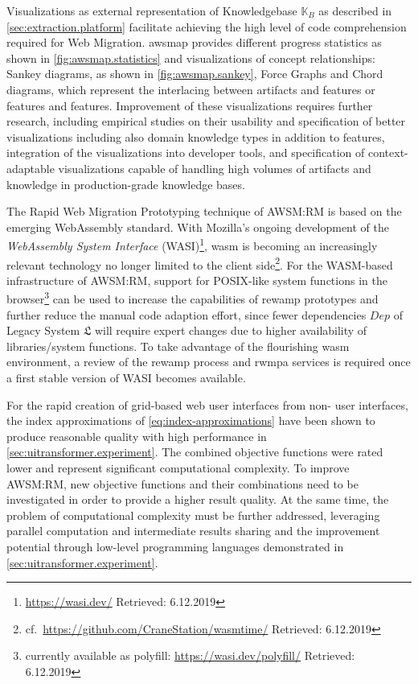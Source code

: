 Visualizations as external representation of Knowledgebase \(\mathbb{K}_{B}\) as described in \cref{sec:extraction.platform} facilitate achieving the high level of code comprehension required for \gls{Web Migration}.
\gls{awsmap} provides different progress statistics as shown in \cref{fig:awsmap.statistics} and visualizations of concept relationships: Sankey diagrams, as shown in \cref{fig:awsmap.sankey}, Force Graphs and Chord diagrams, which represent the interlacing between \glspl{artifact} and features or features and features. %
Improvement of these visualizations requires further research, including empirical studies on their usability and specification of better visualizations including also domain knowledge types in addition to features, integration of the visualizations into developer tools, and specification of context-adaptable visualizations capable of handling high volumes of \glspl{artifact} and knowledge in production-grade knowledge bases.

The \gls{Rapid Web Migration Prototyping} technique of AWSM:RM is based on the emerging WebAssembly standard.
With Mozilla's ongoing development of the \emph{WebAssembly System Interface} (WASI)\footnote{\url{https://wasi.dev/} Retrieved: 6.12.2019}, \gls{wasm} is becoming an increasingly relevant technology no longer limited to the client side\footnote{cf.~\url{https://github.com/CraneStation/wasmtime/} Retrieved: 6.12.2019}.
For the WASM-based infrastructure of AWSM:RM, support for POSIX-like system functions in the browser\footnote{currently available as polyfill: \url{https://wasi.dev/polyfill/} Retrieved: 6.12.2019} can be used to increase the capabilities of \gls{rewamp} prototypes and further reduce the manual code adaption effort, since fewer dependencies \(Dep\) of \gls{Legacy System} \(\mathfrak{L}\) will require expert changes due to higher availability of libraries/system functions.
To take advantage of the flourishing \gls{wasm} environment, a review of the \gls{rewamp} process and \gls{rwmpa} services is required once a first stable version of WASI becomes available.

For the rapid creation of grid-based \gls{web} user interfaces from  non-  user interfaces, the index approximations of \cref{eq:index-approximations} have been shown to produce reasonable quality with high performance in \cref{sec:uitransformer.experiment}.
The combined objective functions were rated lower and represent significant computational complexity.
To improve AWSM:RM, new objective functions and their combinations need to be investigated in order to provide a higher result quality.
At the same time, the problem of computational complexity must be further addressed, leveraging parallel computation and intermediate results sharing and the improvement potential through low-level programming languages demonstrated in \cref{sec:uitransformer.experiment}.

